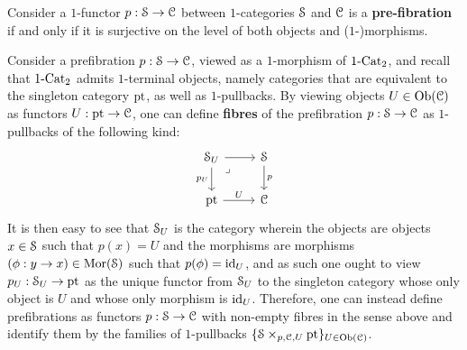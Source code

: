             \begin{definition}[Prefibrations] \label{def: prefibrations}
                Consider a $1$-functor $p: \S \to \C$ between $1$-categories $\S$ and $\C$ is a \textbf{pre-fibration} if and only if it is surjective on the level of both objects and ($1$-)morphisms. 
            \end{definition}
            \begin{remark} \label{remark: fibres_of_prefibrations}
                Consider a prefibration $p: \S \to \C$, viewed as a $1$-morphism of $1\-\Cat_2$, and recall that $1\-\Cat_2$ admits $1$-terminal objects, namely categories that are equivalent to the singleton category $\pt$, as well as $1$-pullbacks. By viewing objects $U \in \Ob(\C)$ as functors $U: \pt \to \C$, one can define \textbf{fibres} of the prefibration $p: \S \to \C$ as $1$-pullbacks of the following kind:
                    $$
                        \begin{tikzcd}
                        	{\S_U} & \S \\
                        	\pt & \C
                        	\arrow["p", from=1-2, to=2-2]
                        	\arrow["U", from=2-1, to=2-2]
                        	\arrow["{p_U}"', from=1-1, to=2-1]
                        	\arrow[from=1-1, to=1-2]
                        	\arrow["\lrcorner"{anchor=center, pos=0.125}, draw=none, from=1-1, to=2-2]
                        \end{tikzcd}
                    $$
                It is then easy to see that $\S_U$ is the category wherein the objects are objects $x \in \S$ such that $p(x) = U$ and the morphisms are morphisms $(\phi: y \to x) \in \Mor(\S)$ such that $p(\phi) = \id_U$, and as such one ought to view $p_U: \S_U \to \pt$ as the unique functor from $\S_U$ to the singleton category whose only object is $U$ and whose only morphism is $\id_U$. Therefore, one can instead define prefibrations as functors $p: \S \to \C$ with non-empty fibres in the sense above and identify them by the families of $1$-pullbacks $\{\S \x_{p, \C, U} \pt\}_{U \in \Ob(\C)}$.
            \end{remark}
